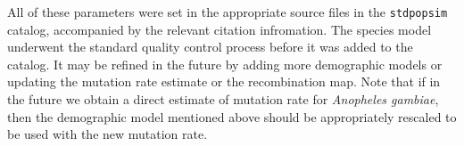 \documentclass[hidelinks]{article}
\newcommand{\stdpopsim}{\texttt{stdpopsim}\xspace}
\begin{document}
All of these parameters were set in the appropriate source files in the \stdpopsim catalog,
accompanied by the relevant citation infromation.
The species model underwent the standard quality control process before it was added to the catalog.
It may be refined in the future by adding more demographic models or updating the mutation rate estimate
or the recombination map. Note that if in the future we obtain a direct estimate of mutation rate for
\emph{Anopheles gambiae}, then the demographic model mentioned above should be appropriately rescaled to be
used with the new mutation rate.



%
%
%
%
\end{document}
